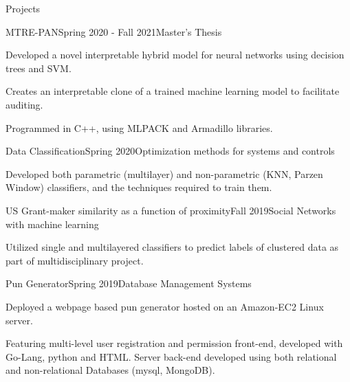 \documentclass{resume}
\begin{document}
% 
% 
\begin{rSection}{Projects}

\begin{rSubsection}{MTRE-PAN}{Spring 2020 - Fall 2021}{{Master's Thesis}}{}
    \item Developed a novel interpretable hybrid model for neural networks using decision trees and SVM.
    \item Creates an interpretable clone of a trained machine learning model to facilitate auditing.
    \item Programmed in C++, using MLPACK and Armadillo libraries.
\end{rSubsection}


\begin{rSubsection}{Data Classification}{Spring 2020}{{Optimization methods for systems and controls}}{}
    \item Developed both parametric (multilayer) and non-parametric (KNN, Parzen Window) classifiers, and the techniques required to train them.
\end{rSubsection}

\begin{rSubsection}{US Grant-maker similarity as a function of proximity}{Fall 2019}{{Social Networks with machine learning}}{}
    \item Utilized single and multilayered classifiers to predict labels of clustered data as part of multidisciplinary project.
\end{rSubsection}

\begin{rSubsection}{Pun Generator}{Spring 2019}{{Database Management Systems}}{}
    \item Deployed a webpage based pun generator hosted on an Amazon-EC2 Linux server.
    \item Featuring multi-level user registration and permission front-end, developed with Go-Lang, python and HTML. Server back-end developed using both relational and non-relational Databases (mysql, MongoDB).
\end{rSubsection}


\end{rSection}
\end{document}
